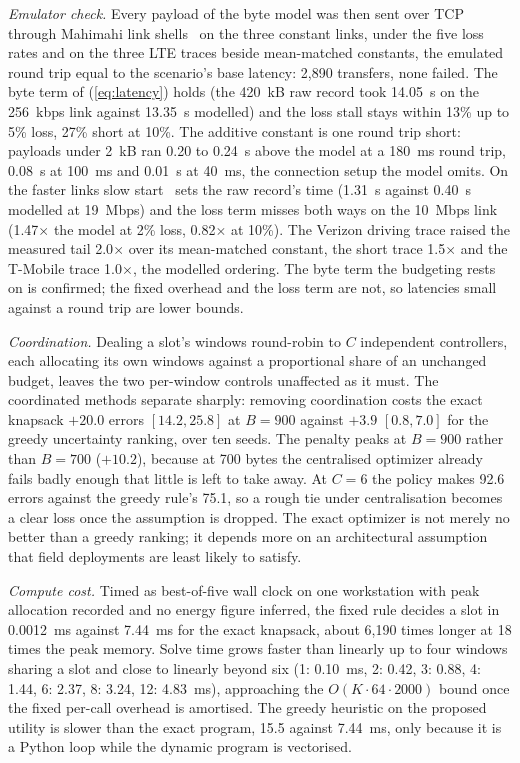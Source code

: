 \documentclass[conference,a4paper]{IEEEtran}
\newif\ifsubmission
\newcommand{\masteronly}[1]{\ifsubmission\else#1\fi}
\begin{document}
\emph{Emulator check.} Every payload of the byte model was then sent over TCP through Mahimahi link shells~\cite{mahimahi} on the three constant links, under the five loss rates and on the three LTE traces beside mean-matched constants, the emulated round trip equal to the scenario's base latency: 2,890 transfers, none failed. The byte term of (\ref{eq:latency}) holds (the 420~kB raw record took 14.05~s on the 256~kbps link against 13.35~s modelled) and the loss stall stays within 13\% up to 5\% loss, 27\% short at 10\%. The additive constant is one round trip short: payloads under 2~kB ran 0.20 to 0.24~s above the model at a 180~ms round trip, 0.08~s at 100~ms and 0.01~s at 40~ms, the connection setup the model omits. On the faster links slow start~\cite{rfc5681} sets the raw record's time (1.31~s against 0.40~s modelled at 19~Mbps) and the loss term misses both ways on the 10~Mbps link (1.47$\times$ the model at 2\% loss, 0.82$\times$ at 10\%). The Verizon driving trace raised the measured tail 2.0$\times$ over its mean-matched constant, the short trace 1.5$\times$ and the T-Mobile trace 1.0$\times$, the modelled ordering. The byte term the budgeting rests on is confirmed; the fixed overhead and the loss term are not, so latencies small against a round trip are lower bounds.

\label{sec:coord}%
\emph{Coordination.} Dealing a slot's windows round-robin to $C$ independent controllers, each allocating its own windows against a proportional share of an unchanged budget, leaves the two per-window controls unaffected as it must. The coordinated methods separate sharply: removing coordination costs the exact knapsack $+20.0$ errors
$[14.2, 25.8]$ at $B=900$ against $+3.9$ $[0.8, 7.0]$ for the greedy uncertainty ranking, over ten seeds.
The penalty peaks at $B=900$ rather than $B=700$ ($+10.2$), because at 700 bytes the centralised optimizer already fails badly enough that little is left to take away. At $C=6$ the policy makes 92.6 errors against the greedy rule's 75.1, so a rough tie under centralisation becomes a clear loss once the assumption is dropped. The exact optimizer is not merely no better than a greedy ranking; it depends more on an architectural assumption that field deployments are least likely to satisfy.

\label{sec:compute}%
\emph{Compute cost.} Timed as best-of-five wall clock on one workstation with peak allocation recorded and no energy figure inferred, the fixed rule decides a slot in 0.0012~ms against 7.44~ms for the exact knapsack, about 6,190 times longer at 18 times the peak memory. Solve time grows faster than linearly up to four windows sharing a slot and close to linearly beyond six\masteronly{ (1: 0.10~ms, 2: 0.42, 3: 0.88, 4: 1.44, 6: 2.37, 8: 3.24, 12: 4.83~ms)}, approaching the $O(K\cdot64\cdot2000)$ bound once the fixed per-call overhead is amortised. The greedy heuristic on the proposed utility is slower than the exact program, 15.5 against 7.44~ms, only because it is a Python loop while the dynamic program is vectorised.
\end{document}

